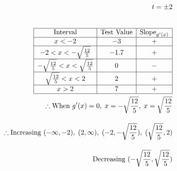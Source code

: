 \documentclass[12pt letter]{report}
\begin{document}
{\begin{align*}
		t = \pm 2                                                                                                                  \\[20pt]
		\begin{array}{|c|c|c|}
			\hline \text{Interval}                                & \text{Test Value} & \text{Slope}_{g^{\prime}(x)} \\
			\hline x < -2                                         & -3                & +                            \\
			\hline -2<x< -\sqrt{\frac{12}{5}}                     & -1.7              & +                            \\
			\hline -\sqrt{\frac{12}{5}} < x < \sqrt{\frac{12}{5}} & 0                 & -                            \\
			\hline \sqrt{\frac{12}{5}} < x <2                     & 2                 & +                            \\
			\hline x > 2                                          & 7                 & +                            \\
			\hline
		\end{array} \\
		\therefore \text{When } g^{\prime}(x) = 0,\; x=-\sqrt{\frac{12}{5} }, \; x=\sqrt{\frac{12}{5}}                             \\[10pt]
		\therefore \text{Increasing } (-\infty, -2) ,\; (2, \infty), \; (-2, -\sqrt{\frac{12}{5}}), \; (\sqrt{\frac{12}{5}}, 2)    \\[10pt]
		\text{Decreasing } (-\sqrt{\frac{12}{5}}, \sqrt{\frac{12}{5}})
	\end{align*}
}
\end{document}
